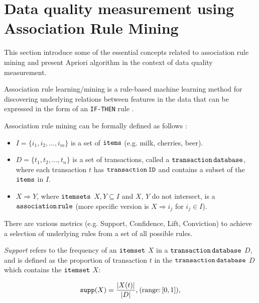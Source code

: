 	\section{Data quality measurement using Association Rule Mining}
	\label{sec:data_quality_measurement_using_asoc_rule_mining}
			
		This section introduce some of the essential concepts related to association rule mining and present Apriori algorithm in the context of data quality measurement.
		
		Association rule learning/mining is a rule-based machine learning method for discovering underlying relations between features in the data that can be expressed in the form of an \texttt{IF-THEN} rule \cite{Zhang2002}\cite{Malik2018}.

		Association rule mining can be formally defined as follows \cite{Zhang2002}\cite{Agrawal1993}:

		\begin{itemize}
			\item $I = \{i_1, i_2, \dotsc ,i_m\}$ is a set of ${\operatorname{\mathtt{items}}}$ (e.g. milk, cherries, beer).
			\item $D = \{t_1, t_2, \dotsc ,t_n\}$ is a set of transactions, called a ${\operatorname{\mathtt{transaction}}}\,{\operatorname{\mathtt{database}}}$, where each transaction $t$ has ${\operatorname{\mathtt{transaction}}}\,{\operatorname{\mathtt{ID}}}$ and contains a subset of the ${\operatorname{\mathtt{items}}}$ in $I$.
			\item $X \Rightarrow Y$, where ${\operatorname{\mathtt{itemsets}}}$ $X, Y \subseteq I$ and $X$, $Y$ do not intersect, is a ${\operatorname{\mathtt{association}}}\,{\operatorname{\mathtt{rule}}}$ (more specific version \cite{Agrawal1993} is $X \Rightarrow i_j$ for $i_j \in I$). 
		\end{itemize}
			
		There are various metrics (e.g. Support, Confidence, Lift, Conviction) to achieve a selection of underlying rules from a set of all possible rules.			
		
		\emph{Support} refers to the frequency of an ${\operatorname{\mathtt{itemset}}}$ $X$ in a ${\operatorname{\mathtt{transaction}}}\,{\operatorname{\mathtt{database}}}$ $D$, and is defined as the proportion of transaction $t$ in the ${\operatorname{\mathtt{transaction}}}\,{\operatorname{\mathtt{database}}}$ $D$ which contains the ${\operatorname{\mathtt{itemset}}}$ $X$:
		
				\begin{equation}
					\label{eqn:support}
					{\operatorname{\mathtt{supp}}}(X) = \frac{|X(t)|}{|D|}\text{,}\:(\text{range:}\,[0,1])\text{,}
				\end{equation}
				
